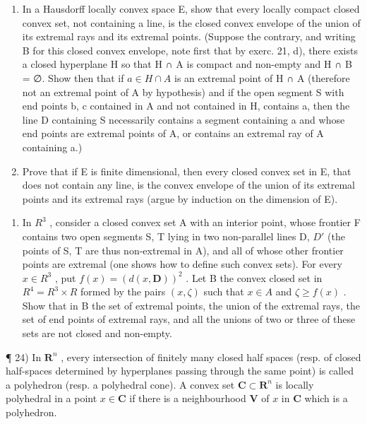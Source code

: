 \begin{enumerate}
\def\labelenumi{\alph{enumi})}
\item
  In a Hausdorff locally convex space E, show that every locally compact closed convex set, not containing a line, is the closed convex envelope of the union of its extremal rays and its extremal points. (Suppose the contrary, and writing B for this closed convex envelope, note first that by exerc. 21, d), there exists a closed hyperplane H so that H ∩ A is compact and non-empty and H ∩ B = ∅. Show then that if \(a \in H \cap A\) is an extremal point of H ∩ A (therefore not an extremal point of A by hypothesis) and if the open segment S with end points b, c contained in A and not contained in H, contains a, then the line D containing S necessarily contains a segment containing a and whose end points are extremal points of A, or contains an extremal ray of A containing a.)
\item
  Prove that if E is finite dimensional, then every closed convex set in E, that does not contain any line, is the convex envelope of the union of its extremal points and its extremal rays (argue by induction on the dimension of E).
\end{enumerate}

\begin{enumerate}
\def\labelenumi{\arabic{enumi})}
\setcounter{enumi}{22}
\tightlist
\item
  In \(R^{3}\) , consider a closed convex set A with an interior point, whose frontier F contains two open segments S, T lying in two non-parallel lines D, \(D'\) (the points of S, T are thus non-extremal in A), and all of whose other frontier points are extremal (one shows how to define such convex sets). For every \(x \in R^{3}\) , put \(f(x) = (d(x, \mathbf{D}))^{2}\) . Let B the convex closed set in \(R^{4} = R^{3} \times R\) formed by the pairs \((x, \zeta)\) such that \(x \in A\) and \(\zeta \geqslant f(x)\) . Show that in B the set of extremal points, the union of the extremal rays, the set of end points of extremal rays, and all the unions of two or three of these sets are not closed and non-empty.
\end{enumerate}

¶ 24) In \(\mathbf{R}^n\) , every intersection of finitely many closed half spaces (resp. of closed half-spaces determined by hyperplanes passing through the same point) is called a polyhedron (resp. a polyhedral cone). A convex set \(\mathbf{C} \subset \mathbf{R}^n\) is locally polyhedral in a point \(x \in \mathbf{C}\) if there is a neighbourhood \(\mathbf{V}\) of \(x\) in \(\mathbf{C}\) which is a polyhedron.

